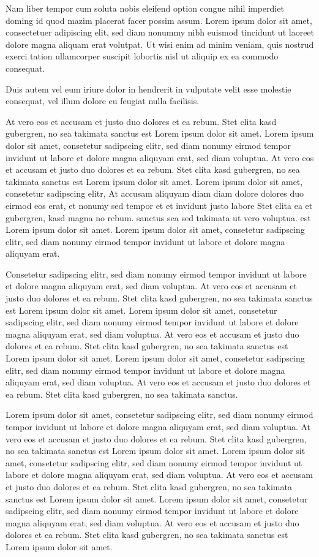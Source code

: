 Nam liber tempor cum soluta nobis eleifend option congue nihil imperdiet doming id quod mazim placerat facer possim assum. Lorem ipsum dolor sit amet, consectetuer adipiscing elit, sed diam nonummy nibh euismod tincidunt ut laoreet dolore magna aliquam erat volutpat. Ut wisi enim ad minim veniam, quis nostrud exerci tation ullamcorper suscipit lobortis nisl ut aliquip ex ea commodo consequat.  

Duis autem vel eum iriure dolor in hendrerit in vulputate velit esse molestie consequat, vel illum dolore eu feugiat nulla facilisis.   

At vero eos et accusam et justo duo dolores et ea rebum. Stet clita kasd gubergren, no sea takimata sanctus est Lorem ipsum dolor sit amet. Lorem ipsum dolor sit amet, consetetur sadipscing elitr, sed diam nonumy eirmod tempor invidunt ut labore et dolore magna aliquyam erat, sed diam voluptua. At vero eos et accusam et justo duo dolores et ea rebum. Stet clita kasd gubergren, no sea takimata sanctus est Lorem ipsum dolor sit amet. Lorem ipsum dolor sit amet, consetetur sadipscing elitr, At accusam aliquyam diam diam dolore dolores duo eirmod eos erat, et nonumy sed tempor et et invidunt justo labore Stet clita ea et gubergren, kasd magna no rebum. sanctus sea sed takimata ut vero voluptua. est Lorem ipsum dolor sit amet. Lorem ipsum dolor sit amet, consetetur sadipscing elitr, sed diam nonumy eirmod tempor invidunt ut labore et dolore magna aliquyam erat.  

Consetetur sadipscing elitr, sed diam nonumy eirmod tempor invidunt ut labore et dolore magna aliquyam erat, sed diam voluptua. At vero eos et accusam et justo duo dolores et ea rebum. Stet clita kasd gubergren, no sea takimata sanctus est Lorem ipsum dolor sit amet. Lorem ipsum dolor sit amet, consetetur sadipscing elitr, sed diam nonumy eirmod tempor invidunt ut labore et dolore magna aliquyam erat, sed diam voluptua. At vero eos et accusam et justo duo dolores et ea rebum. Stet clita kasd gubergren, no sea takimata sanctus est Lorem ipsum dolor sit amet. Lorem ipsum dolor sit amet, consetetur sadipscing elitr, sed diam nonumy eirmod tempor invidunt ut labore et dolore magna aliquyam erat, sed diam voluptua. At vero eos et accusam et justo duo dolores et ea rebum. Stet clita kasd gubergren, no sea takimata sanctus.  

Lorem ipsum dolor sit amet, consetetur sadipscing elitr, sed diam nonumy eirmod tempor invidunt ut labore et dolore magna aliquyam erat, sed diam voluptua. At vero eos et accusam et justo duo dolores et ea rebum. Stet clita kasd gubergren, no sea takimata sanctus est Lorem ipsum dolor sit amet. Lorem ipsum dolor sit amet, consetetur sadipscing elitr, sed diam nonumy eirmod tempor invidunt ut labore et dolore magna aliquyam erat, sed diam voluptua. At vero eos et accusam et justo duo dolores et ea rebum. Stet clita kasd gubergren, no sea takimata sanctus est Lorem ipsum dolor sit amet. Lorem ipsum dolor sit amet, consetetur sadipscing elitr, sed diam nonumy eirmod tempor invidunt ut labore et dolore magna aliquyam erat, sed diam voluptua. At vero eos et accusam et justo duo dolores et ea rebum. Stet clita kasd gubergren, no sea takimata sanctus est Lorem ipsum dolor sit amet.  

